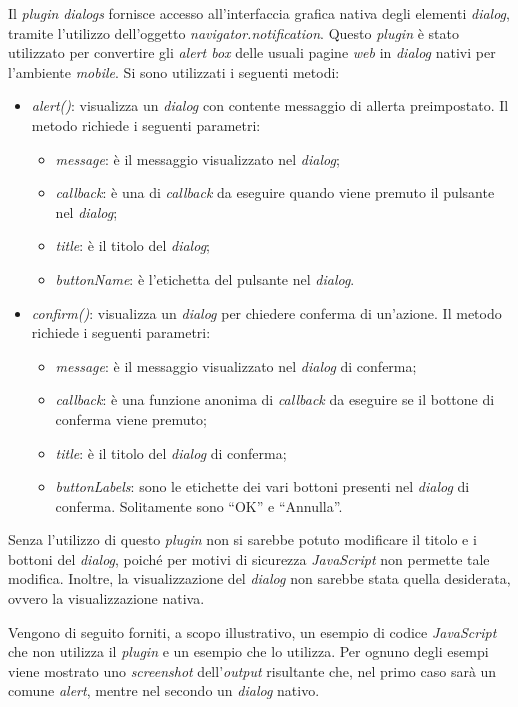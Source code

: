 Il \textit{plugin} \textit{dialogs} fornisce accesso all'interfaccia grafica nativa degli elementi \textit{dialog}, tramite l'utilizzo dell'oggetto \textit{navigator.notification}. Questo \textit{plugin} è stato utilizzato per convertire gli \textit{alert box} delle usuali pagine \textit{web} in \textit{dialog} nativi per l'ambiente \textit{mobile}. Si sono utilizzati i seguenti metodi:
\begin{itemize}
	\item \textit{alert()}: visualizza un \textit{dialog} con contente messaggio di allerta preimpostato. Il metodo richiede i seguenti parametri:
	\begin{itemize}
		\item \textit{message}: è il messaggio visualizzato nel \textit{dialog};
		\item \textit{callback}: è una  di \textit{callback} da eseguire quando viene premuto il pulsante nel \textit{dialog};
		\item \textit{title}: è il titolo del \textit{dialog};
		\item \textit{buttonName}: è l'etichetta del pulsante nel \textit{dialog}.
	\end{itemize}
	\item \textit{confirm()}: visualizza un \textit{dialog} per chiedere conferma di un'azione. Il metodo richiede i seguenti parametri:
	\begin{itemize}
		\item \textit{message}: è il messaggio visualizzato nel \textit{dialog} di conferma;
		\item \textit{callback}: è una funzione anonima di \textit{callback} da eseguire se il bottone di conferma viene premuto;
		\item \textit{title}: è il titolo del \textit{dialog} di conferma;
		\item \textit{buttonLabels}: sono le etichette dei vari bottoni presenti nel \textit{dialog} di conferma. Solitamente sono ``OK'' e ``Annulla''.
	\end{itemize}
\end{itemize}

Senza l'utilizzo di questo \textit{plugin} non si sarebbe potuto modificare il titolo e i bottoni del \textit{dialog}, poiché per motivi di sicurezza \textit{JavaScript} non permette tale modifica. Inoltre, la visualizzazione del \textit{dialog} non sarebbe stata quella desiderata, ovvero la visualizzazione nativa. 

Vengono di seguito forniti, a scopo illustrativo, un esempio di codice \textit{JavaScript} che non utilizza il \textit{plugin} e un esempio che lo utilizza. Per ognuno degli esempi viene mostrato uno \textit{screenshot} dell'\textit{output} risultante che, nel primo caso sarà un comune \textit{alert}, mentre nel secondo un \textit{dialog} nativo.

